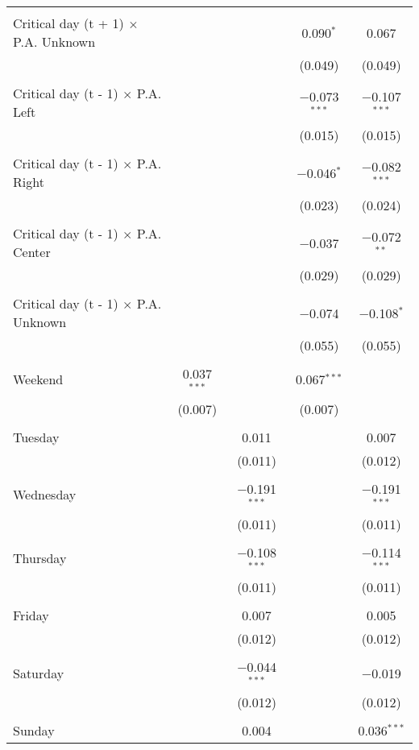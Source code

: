 \documentclass[
]{article}
\begin{document}
\begin{table}[!htbp]
{\begin{tabular}{@{\extracolsep{5pt}}lcccc}
  & & & & \\ 
 Critical day (t + 1) $\times$ P.A. Unknown &  &  & 0.090$^{*}$ & 0.067 \\ 
  &  &  & (0.049) & (0.049) \\ 
  & & & & \\ 
 Critical day (t - 1) $\times$ P.A. Left &  &  & $-$0.073$^{***}$ & $-$0.107$^{***}$ \\ 
  &  &  & (0.015) & (0.015) \\ 
  & & & & \\ 
 Critical day (t - 1) $\times$ P.A. Right &  &  & $-$0.046$^{*}$ & $-$0.082$^{***}$ \\ 
  &  &  & (0.023) & (0.024) \\ 
  & & & & \\ 
 Critical day (t - 1) $\times$ P.A. Center &  &  & $-$0.037 & $-$0.072$^{**}$ \\ 
  &  &  & (0.029) & (0.029) \\ 
  & & & & \\ 
 Critical day (t - 1) $\times$ P.A. Unknown &  &  & $-$0.074 & $-$0.108$^{*}$ \\ 
  &  &  & (0.055) & (0.055) \\ 
  & & & & \\ 
 Weekend & 0.037$^{***}$ &  & 0.067$^{***}$ &  \\ 
  & (0.007) &  & (0.007) &  \\ 
  & & & & \\ 
 Tuesday &  & 0.011 &  & 0.007 \\ 
  &  & (0.011) &  & (0.012) \\ 
  & & & & \\ 
 Wednesday &  & $-$0.191$^{***}$ &  & $-$0.191$^{***}$ \\ 
  &  & (0.011) &  & (0.011) \\ 
  & & & & \\ 
 Thursday &  & $-$0.108$^{***}$ &  & $-$0.114$^{***}$ \\ 
  &  & (0.011) &  & (0.011) \\ 
  & & & & \\ 
 Friday &  & 0.007 &  & 0.005 \\ 
  &  & (0.012) &  & (0.012) \\ 
  & & & & \\ 
 Saturday &  & $-$0.044$^{***}$ &  & $-$0.019 \\ 
  &  & (0.012) &  & (0.012) \\ 
  & & & & \\ 
 Sunday &  & 0.004 &  & 0.036$^{***}$ \\ 

\end{tabular}}
\end{table}
\end{document}
